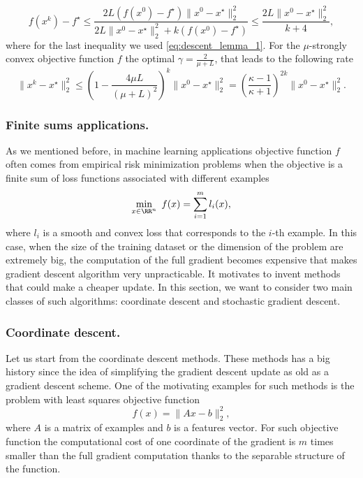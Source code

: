 \begin{equation}\label{eq:gd_rate}
    f(x^k) - f^\star \leq \frac{2L(f(x^0)-f^\star)\|x^0-x^\star\|_2^2}{2L\|x^0-x^\star\|_2^2 +k(f(x^0) - f^\star)}\leq \frac{2L\|x^0-x^\star\|^2_2}{k+4},
\end{equation}
where for the last inequality we used \eqref{eq:descent_lemma_1}.
For the $\mu$-strongly convex objective function $f$ the optimal $\gamma= \frac{2}{\mu + L}$, that leads to the following rate
\begin{equation}\label{eq:gd_rate_strongly}
\|x^k-x^\star\|_2^2\leq\left(1-\frac{4\mu L}{(\mu + L)^2}\right)^k\|x^0-x^\star\|_2^2 = \left(\frac{\kappa - 1}{\kappa + 1}\right)^{2k}\|x^0-x^\star\|_2^2.
\end{equation}






\subsubsection{Finite sums applications.}

As we mentioned before, in machine learning applications objective function $f$ often comes from empirical risk minimization problems when the objective is a finite sum of loss functions associated with different examples 
\begin{equation}
\min_{x\in\RR^n}~f(x) = \sum_{i=1}^m l_i(x),
\end{equation}
where $l_i$ is a smooth and convex loss that corresponds to the $i$-th example. In this case, when the size of the training dataset or the dimension of the problem are extremely big, the computation of the full gradient becomes expensive that makes gradient descent algorithm very unpracticable. It motivates to invent methods that could make a cheaper update. In this section, we want to consider two main classes of such algorithms: coordinate descent and stochastic gradient descent.


\subsubsection{Coordinate descent.}
Let us start from the coordinate descent methods. These methods has a big history since the idea of simplifying the gradient descent update as old as a gradient descent scheme. One of the motivating examples for such methods is the problem with least squares objective function
$$
f(x) = \|Ax-b\|_2^2,
$$
where $A$ is a matrix of examples and $b$ is a features vector. For such objective function the computational cost of one coordinate of the gradient is $m$ times smaller than the full gradient computation thanks to the separable structure of the function.

